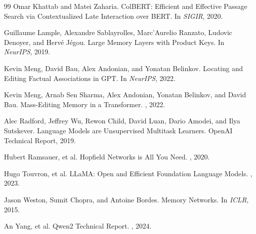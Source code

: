 \documentclass[11pt,a4paper]{article}
\begin{document}
\begin{thebibliography}{99}
Omar Khattab and Matei Zaharia.
\newblock ColBERT: Efficient and Effective Passage Search via Contextualized Late Interaction over BERT.
\newblock In {\em SIGIR}, 2020.

Guillaume Lample, Alexandre Sablayrolles, Marc'Aurelio Ranzato, Ludovic Denoyer, and Herv\'e J\'egou.
\newblock Large Memory Layers with Product Keys.
\newblock In {\em NeurIPS}, 2019.

Kevin Meng, David Bau, Alex Andonian, and Yonatan Belinkov.
\newblock Locating and Editing Factual Associations in GPT.
\newblock In {\em NeurIPS}, 2022.

Kevin Meng, Arnab Sen Sharma, Alex Andonian, Yonatan Belinkov, and David Bau.
\newblock Mass-Editing Memory in a Transformer.
, 2022.

Alec Radford, Jeffrey Wu, Rewon Child, David Luan, Dario Amodei, and Ilya Sutskever.
\newblock Language Models are Unsupervised Multitask Learners.
\newblock OpenAI Technical Report, 2019.

Hubert Ramsauer, et al.
\newblock Hopfield Networks is All You Need.
, 2020.

Hugo Touvron, et al.
\newblock LLaMA: Open and Efficient Foundation Language Models.
, 2023.

Jason Weston, Sumit Chopra, and Antoine Bordes.
\newblock Memory Networks.
\newblock In {\em ICLR}, 2015.

An Yang, et al.
\newblock Qwen2 Technical Report.
, 2024.

\end{thebibliography}
\end{document}
